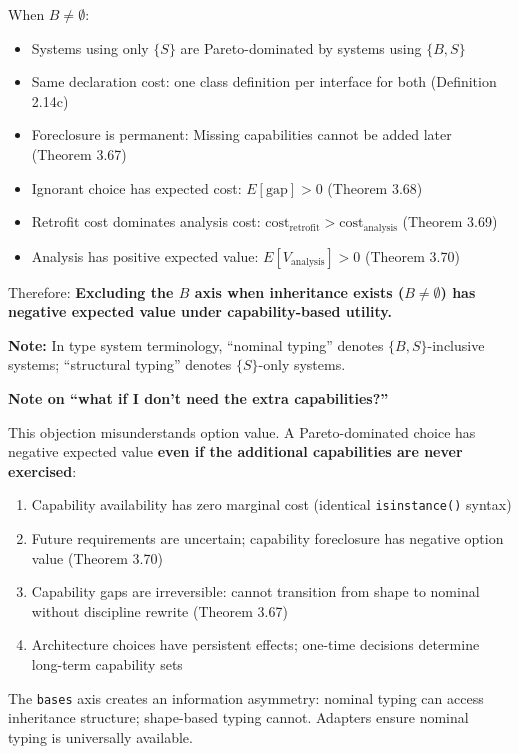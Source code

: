 When \(B \neq \emptyset\):
\begin{itemize}
\item Systems using only $\{S\}$ are Pareto-dominated by systems using $\{B, S\}$
\item Same declaration cost: one class definition per interface for both (Definition 2.14c)
\item Foreclosure is permanent: Missing capabilities cannot be added later (Theorem 3.67)
\item Ignorant choice has expected cost: \(E[\text{gap}] > 0\) (Theorem 3.68)
\item Retrofit cost dominates analysis cost: \(\text{cost}_{\text{retrofit}} > \text{cost}_{\text{analysis}}\) (Theorem 3.69)
\item Analysis has positive expected value: \(E[V_{\text{analysis}}] > 0\) (Theorem 3.70)
\end{itemize}

Therefore: \textbf{Excluding the $B$ axis when inheritance exists ($B \neq \emptyset$)
has negative expected value under capability-based utility.}

\textbf{Note:} In type system terminology, ``nominal typing'' denotes $\{B, S\}$-inclusive systems; ``structural typing'' denotes $\{S\}$-only systems.

\textbf{Note on ``what if I don't need the extra capabilities?''}

This objection misunderstands option value. A Pareto-dominated choice
has negative expected value \textbf{even if the additional capabilities
are never exercised}:

\begin{enumerate}
\item Capability availability has zero marginal cost (identical \texttt{isinstance()} syntax)
\item Future requirements are uncertain; capability foreclosure has negative option value (Theorem 3.70)
\item Capability gaps are irreversible: cannot transition from shape to nominal without discipline rewrite (Theorem 3.67)
\item Architecture choices have persistent effects; one-time decisions determine long-term capability sets
\end{enumerate}

The \texttt{bases} axis creates an information asymmetry: nominal typing
can access inheritance structure; shape-based typing cannot. Adapters
ensure nominal typing is universally available.

